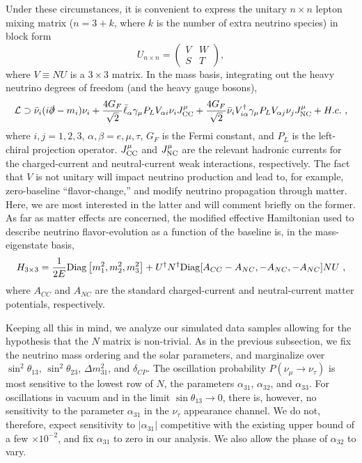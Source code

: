 \documentclass[aps,prd,onecolumn,nofootinbib,superscriptaddress, 11pt]{revtex4}
\begin{document}
Under these circumstances, it is convenient to express the unitary $n\times n$ lepton mixing matrix ($n=3+k$, where $k$ is the number of extra neutrino species) in block form
\begin{equation}
 U_{n\times n}=\left(\begin{array}{cc}
                V & W \\
                S & T
               \end{array}
\right),
\end{equation}
where $V\equiv NU$ is a $3\times 3$ matrix. In the mass basis, integrating out the heavy neutrino degrees of freedom (and the heavy gauge bosons),
\begin{equation}
 {\cal L}\supset\bar{\nu}_i (i\slashed{\partial}-m_i)\nu_i+\frac{4G_F}{\sqrt{2}}\bar{\ell}_{\alpha}\gamma_{\mu}P_LV_{\alpha i}\nu_{i}J^{\mu}_{\rm CC} + \frac{4G_F}{\sqrt{2}}\bar{\nu}_{i}V^{\dagger}_{i\alpha}\gamma_{\mu}P_LV_{\alpha j}\nu_jJ^{\mu}_{\rm NC}+ H.c.~,
  \label{eq:lagran_mass}
\end{equation}
where $i,j=1,2,3$, $\alpha,\beta=e,\mu,\tau$, $G_F$ is the Fermi constant, and $P_L$ is the left-chiral projection operator. $J^\mu_{\rm CC}$ and $J^\mu_{\rm NC}$ are the relevant hadronic currents for the charged-current and neutral-current weak interactions, respectively. The fact that $V$ is not unitary will impact neutrino production and lead to, for example, zero-baseline ``flavor-change,'' and modify neutrino propagation through matter. Here, we are most interested in the latter and will comment briefly on the former. As far as matter effects are concerned, the modified effective Hamiltonian used to describe neutrino flavor-evolution as a function of the baseline is, in the mass-eigenstate basis,
\begin{equation}
 H_{3\times 3}=\frac{1}{2E}{\rm Diag}\left[m_1^2,m_2^2,m_3^2\right]+U^{\dagger}N^\dagger {\rm Diag}[A_{CC}-A_{NC},-A_{NC},-A_{NC}] NU~,
\end{equation}
where  $A_{CC}$ and $A_{NC}$ are the standard charged-current and neutral-current matter potentials,  respectively.

Keeping all this in mind, we analyze our simulated data samples allowing for the hypothesis that the $N$ matrix is non-trivial. As in the previous subsection, we fix the neutrino mass ordering and the solar parameters, and marginalize over $\sin^2 \theta_{13}$, $\sin^2\theta_{23}$, $\Delta m_{31}^2$, and $\delta_{CP}$. The oscillation probability $P(\nu_\mu\to\nu_\tau)$ is most sensitive to the lowest row of $N$, the parameters $\alpha_{31}$, $\alpha_{32}$, and $\alpha_{33}$. For oscillations in vacuum and in the limit $\sin{\theta_{13}} \to 0$, there is, however, no sensitivity to the parameter $\alpha_{31}$ in the $\nu_\tau$ appearance channel. We do not, therefore, expect sensitivity to $|\alpha_{31}|$ competitive with the existing upper bound of a  few $\times 10^{-2}$, and  fix $\alpha_{31}$ to zero in our analysis. We also allow the phase of $\alpha_{32}$ to vary.
\end{document}
